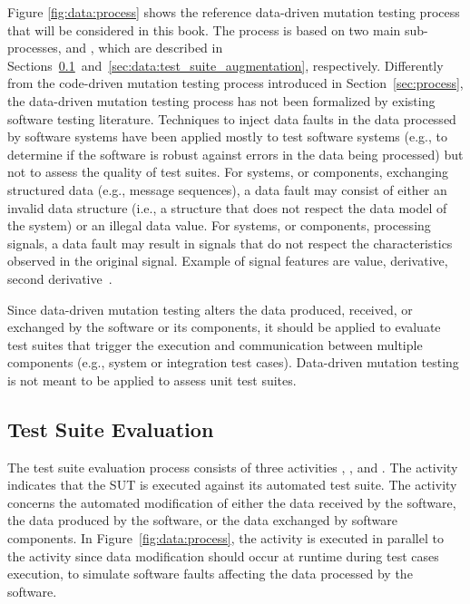 Figure \ref{fig:data:process} shows the reference data-driven mutation testing process that will be considered in this book. The process is based on two main sub-processes,  and , which are described in Sections~\ref{sec:data:test_suite_evaluation}~and~\ref{sec:data:test_suite_augmentation}, respectively. Differently from the code-driven mutation testing process introduced in Section~\ref{sec:process}, the data-driven mutation testing process has not been formalized by existing software testing literature. 
Techniques to inject data faults in the data processed by software systems have been applied mostly to test software systems (e.g., to determine if the software is robust against errors in the data being processed) but not to assess the quality of test suites.
For systems, or components, exchanging structured data (e.g., message sequences), a data fault may consist of either an invalid data structure (i.e., a structure that does not respect the data model of the system) or an illegal data value.
For systems, or components, processing signals, a data fault may result in signals that do not respect the characteristics observed in the original signal. Example of signal features are value, derivative, second derivative~\cite{Matinnejad19}.

Since data-driven mutation testing alters the data produced, received, or exchanged by the software or its components, it should be applied to evaluate test suites that trigger the execution and communication between multiple components (e.g., system or integration test cases). Data-driven mutation testing is not meant to be applied to assess unit test suites.

\subsection{Test Suite Evaluation} %
\label{sec:data:test_suite_evaluation}

The test suite evaluation process consists of three activities , ,  and .
The activity  indicates that the SUT is executed against its automated test suite. 
The activity  concerns the automated modification of either the data received by the software, the data produced by the software, or the data exchanged by software components.
In Figure~\ref{fig:data:process}, the activity  is executed in parallel to the activity  since data modification should occur at runtime during test cases execution, to simulate software faults affecting the data processed by the software.

